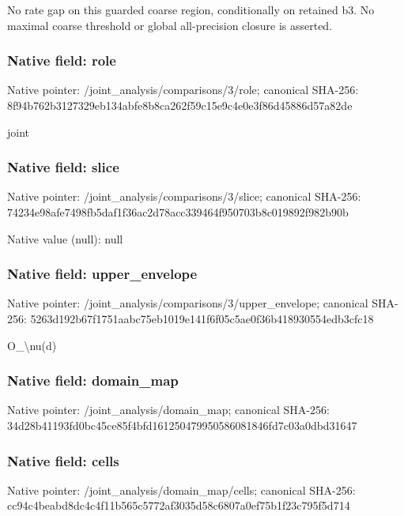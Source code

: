 \documentclass[10pt,a4paper]{article}
\begin{document}
\begingroup\raggedright\sloppy No rate gap on this guarded coarse region,\allowbreak{} conditionally on retained b3. No maximal coarse threshold or global all-precision closure is asserted.\par\endgroup

\subsubsection{Native field: role}
Native pointer: /joint\_\allowbreak{}analysis/comparisons/3/role; canonical SHA-256: 8f94b762b3127329eb134abfe8b8ca262f59c15e9c4e0e3f86d45886d57a82de

\begingroup\raggedright\sloppy joint\par\endgroup

\subsubsection{Native field: slice}
Native pointer: /joint\_\allowbreak{}analysis/comparisons/3/slice; canonical SHA-256: 74234e98afe7498fb5daf1f36ac2d78acc339464f950703b8c019892f982b90b

Native value (null): null

\subsubsection{Native field: upper\_\allowbreak{}envelope}
Native pointer: /joint\_\allowbreak{}analysis/comparisons/3/upper\_\allowbreak{}envelope; canonical SHA-256: 5263d192b67f1751aabc75eb1019e141f6f05c5ae0f36b418930554edb3cfc18

\begingroup\raggedright\sloppy O\_\allowbreak{}\textbackslash{}nu(d)\par\endgroup

\subsubsection{Native field: domain\_\allowbreak{}map}
Native pointer: /joint\_\allowbreak{}analysis/domain\_\allowbreak{}map; canonical SHA-256: 34d28b41193fd0bc45ce85f4bfd161250479950586081846fd7c03a0dbd31647

\subsubsection{Native field: cells}
Native pointer: /joint\_\allowbreak{}analysis/domain\_\allowbreak{}map/cells; canonical SHA-256: cc94c4beabd8dc4c4f11b565c5772af3035d58c6807a0ef75b1f23c795f5d714
\end{document}
